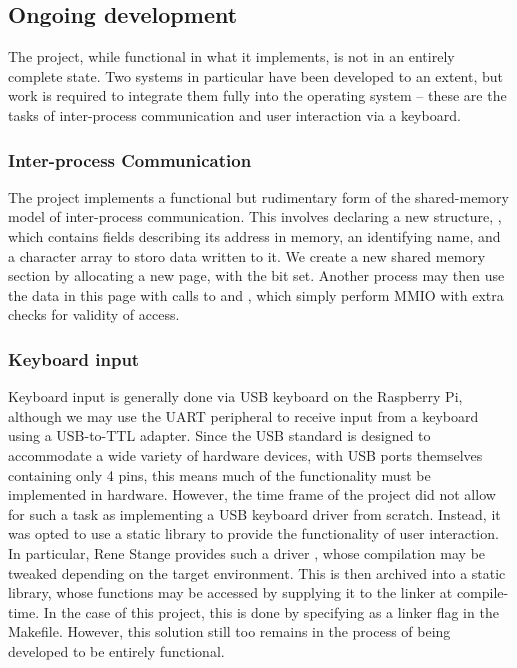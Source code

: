 \subsection{Ongoing development}
    The project, while functional in what it implements, is not in an entirely
    complete state. Two systems in particular have been developed to an extent,
    but work is required to integrate them fully into the operating system --
    these are the tasks of inter-process communication and user interaction via
    a keyboard.

    \subsubsection{Inter-process Communication}
        The project implements a functional but rudimentary form of the
        shared-memory model of inter-process communication. This involves
        declaring a new structure, , which contains
        fields describing its address in memory, an identifying name, and a
        character array to storo data written to it. We create a new shared
        memory section by allocating a new page, with the  bit set.
        Another process may then use the data in this page with calls to
         and , which simply perform MMIO
        with extra checks for validity of access.

    \subsubsection{Keyboard input}
        \label{sec:StaticLibrary}
        Keyboard input is generally done via USB keyboard on the Raspberry Pi,
        although we may use the UART peripheral to receive input from a keyboard
        using a USB-to-TTL adapter. Since the USB standard is designed to
        accommodate a wide variety of hardware devices, with USB ports
        themselves containing only 4 pins, this means much of the functionality
        must be implemented in hardware. However, the time frame of the project
        did not allow for such a task as implementing a USB keyboard driver from
        scratch. Instead, it was opted to use a static library to provide the
        functionality of user interaction. In particular, Rene Stange provides
        such a driver \cite{USPi}, whose compilation may be tweaked depending on
        the target environment. This is then archived into a static library,
        whose functions may be accessed by supplying it to the linker at
        compile-time. In the case of this project, this is done by specifying
         as a linker flag in the Makefile. However, this solution
        still too remains in the process of being developed to be entirely
        functional.
